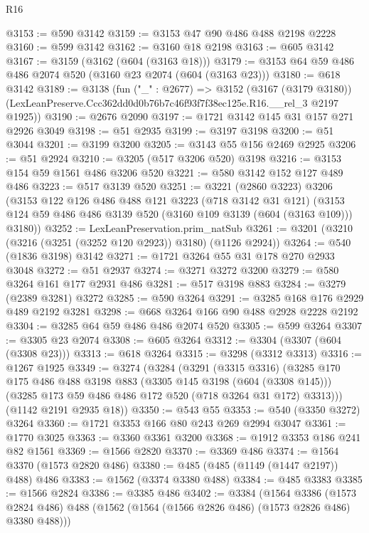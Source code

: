 \begin{lexlean}{R16}
\begin{coremodule}
@3153 := @590 @3142
@3159 := @3153 @47 @90 @486 @488 @2198 @2228
@3160 := @599 @3142
@3162 := @3160 @18 @2198
@3163 := @605 @3142
@3167 := @3159 (@3162 (@604 (@3163 @18)))
@3179 := @3153 @64 @59 @486 @486 @2074 @520 (@3160 @23 @2074 (@604 (@3163 @23)))
@3180 := @618 @3142
@3189 := @3138
    (fun ("_" : @2677) =>
    @3152
      (@3167 (@3179 @3180))
      (LexLeanPreserve.Ccc362dd0d0b76b7c46f93f7f38ec125e.R16.__rel_3 @2197 @1925))
@3190 := @2676 @2090
@3197 := @1721 @3142 @145 @31 @157 @271 @2926 @3049
@3198 := @51 @2935
@3199 := @3197 @3198
@3200 := @51 @3044
@3201 := @3199 @3200
@3205 := @3143 @55 @156 @2469 @2925
@3206 := @51 @2924
@3210 := @3205 (@517 @3206 @520) @3198
@3216 := @3153 @154 @59 @1561 @486 @3206 @520
@3221 := @580 @3142 @152 @127 @489 @486
@3223 := @517 @3139 @520
@3251 := @3221
    (@2860 @3223)
    @3206
    (@3153
      @122
      @126
      @486
      @488
      @121
      @3223
      (@718 @3142 @31 @121)
      (@3153 @124 @59 @486 @486 @3139 @520 (@3160 @109 @3139 (@604 (@3163 @109))) @3180))
@3252 := LexLeanPreservation.prim_natSub
@3261 := @3201 (@3210 (@3216 (@3251 (@3252 @120 @2923)) @3180) (@1126 @2924))
@3264 := @540 (@1836 @3198) @3142
@3271 := @1721 @3264 @55 @31 @178 @270 @2933 @3048
@3272 := @51 @2937
@3274 := @3271 @3272 @3200
@3279 := @580 @3264 @161 @177 @2931 @486
@3281 := @517 @3198 @883
@3284 := @3279 (@2389 @3281) @3272
@3285 := @590 @3264
@3291 := @3285 @168 @176 @2929 @489 @2192 @3281
@3298 := @668 @3264 @166 @90 @488 @2928 @2228 @2192
@3304 := @3285 @64 @59 @486 @486 @2074 @520
@3305 := @599 @3264
@3307 := @3305 @23 @2074
@3308 := @605 @3264
@3312 := @3304 (@3307 (@604 (@3308 @23)))
@3313 := @618 @3264
@3315 := @3298 (@3312 @3313)
@3316 := @1267 @1925
@3349 := @3274
    (@3284
      (@3291
        (@3315 @3316)
        (@3285
          @170
          @175
          @486
          @488
          @3198
          @883
          (@3305 @145 @3198 (@604 (@3308 @145)))
          (@3285 @173 @59 @486 @486 @172 @520 (@718 @3264 @31 @172) @3313)))
      (@1142 @2191 @2935 @18))
@3350 := @543 @55
@3353 := @540 (@3350 @3272) @3264
@3360 := @1721 @3353 @166 @80 @243 @269 @2994 @3047
@3361 := @1770 @3025
@3363 := @3360 @3361 @3200
@3368 := @1912 @3353 @186 @241 @82 @1561
@3369 := @1566 @2820
@3370 := @3369 @486
@3374 := @1564 @3370 (@1573 @2820 @486)
@3380 := @485 (@485 (@1149 (@1447 @2197)) @488) @486
@3383 := @1562 (@3374 @3380 @488)
@3384 := @485 @3383
@3385 := @1566 @2824
@3386 := @3385 @486
@3402 := @3384
    (@1564
      @3386
      (@1573 @2824 @486)
      @488
      (@1562 (@1564 (@1566 @2826 @486) (@1573 @2826 @486) @3380 @488)))

\end{coremodule}
\end{lexlean}
